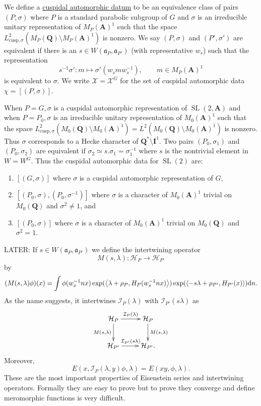 \documentclass[11pt]{amsart}
\def\A{\mathbf A}
\def\I{\mathbf I}
\def\Q{\mathbf Q}
\def\HHH{\mathcal H}
\def\III{\mathcal I}
\def\XXX{\mathcal X}
\def\aaa{\mathfrak a}
\def\cb#1{{\color{blue}#1}}
\def\d{\text d}
\def\bs{\setminus} 			%
\def\cusp{\text{cusp}}
\def\Ltwo{L^2}
\def\sl{\operatorname{SL}}
\def\sprod#1#2{\left\langle #1 , #2 \right\rangle}  %
\theoremstyle{remark}
\begin{document}
We define a \underline{cuspidal automorphic datum} to be an equivalence class of pairs $(P, \sigma)$ where $P$ is a standard parabolic subgroup of $G$ and $\sigma$ is an irreducible unitary representation of $M_P(\A)^1$ such that the space $\Ltwo_{\cusp, \sigma} (M_P(\Q)\bs M_P(\A)^1)$ is nonzero. We say $(P, \sigma)$ and $(P', \sigma')$ are equivalent if there is an $s \in W(\aaa_P, \aaa_{P'})$ (with representative $w_s$) such that the representation 
\[ s^{-1}\sigma' : m \mapsto \sigma'(w_s m w_s^{-1}), \qquad m \in M_P(\A)^1 \]
is equivalent to $\sigma$. We write $\XXX = \XXX^G$ for the set of cuspidal automorphic data $\chi = [(P, \sigma)]$. 
\cb{
When $P=G, \sigma$ is a cuspidal automorphic representation of $\sl(2,\A)$ and when $P=P_0, \sigma$ is an irreducible unitary representation of $M_0(\A)^1$ such that the space $\Ltwo_{\text{cusp}, \sigma}(M_0(\Q)\bs M_0(\A)^1) = \Ltwo(M_0(\Q)\bs M_0(\A)^1)$ is nonzero. Thus $\sigma$ corresponds to a Hecke character of $\Q^*\bs \I^1$. Two pairs $(P_0, \sigma_1)$ and $(P_0, \sigma_2)$ are equivalent if $\sigma_2 \simeq s.\sigma_1 = \sigma_1^{-1}$ where $s$ is the nontrivial element in $W = W^G$. Thus the cuspidal automorphic data for $\sl(2)$ are:
\begin{enumerate}
\item $[(G, \sigma)]$ where $\sigma$ is a cuspidal automorphic representation of $G$,
\item $[(P_0, \sigma), (P_0, \sigma^{-1})]$ where $\sigma$ is a character of $M_0(\A)^1$ trivial on $M_0(\Q)$ and $\sigma^2 \neq 1$, and
\item $[(P_0, \sigma)]$ where $\sigma$ is a character of $M_0(\A)^1$ trivial on $M_0(\Q)$ and $\sigma^2 = 1$.
\end{enumerate}
}

{\color{red} LATER: If $s \in W(\aaa_P, \aaa_{P'})$ we define the intertwining operator
\[ M(s, \lambda) : \HHH_P \to \HHH_{P'} \]
by
\[ (M(s, \lambda)\phi)(x) = \int \phi(w_x^{-1}n x) \exp(\sprod{\lambda + \rho_P}{H_P(w_s^{-1}n x)})
				 \exp(\sprod{- s\lambda + \rho_{P'}}{H_{P'}(x)}) \d n. \]
As the name suggests, it intertwines $\III_P(\lambda)$ with $\III_{P'}(s\lambda)$ as
\[ \xymatrix{
	\HHH_P \ar[r]^{\III_P(\lambda)} \ar[d]_{M(s, \lambda)} & \HHH_P \ar[d]^{M(s, \lambda)} \\
	\HHH_{P'} \ar[r]^{\III_{P'}(s\lambda)} & \HHH_{P'}.
 } \]
Moreover,
\[ E(x, \III_P(\lambda, y)\phi, \lambda) = E(xy, \phi, \lambda). \]
These are the most important properties of Eisenstein series and intertwining operators. Formally they are easy to prove but to prove they converge and define meromorphic functions is very difficult. }
\end{document}
